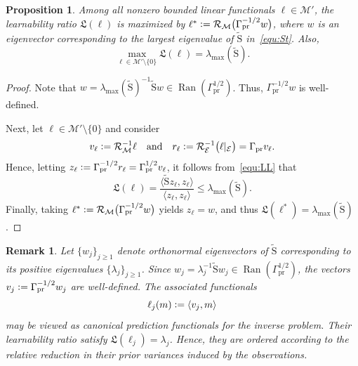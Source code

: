\documentclass[ba]{imsart}
\theoremstyle{plain}
\newtheorem{proposition}[theorem]{Proposition}
\newtheorem{remark}[theorem]{Remark}
\newcommand{\defeq}{\vcentcolon=}
\newcommand{\prcov}{\Gamma_{\mathrm{pr}}}
\newcommand{\St}{\widetilde{\mathrm{S}}}
\newcommand{\dpar}{{m}}
\newcommand{\ip}[2]{\langle {#1}, {#2}\rangle}
\newcommand{\M}{\mathcal{M}}
\newcommand{\RR}{\mathcal{R}}
\newcommand{\LL}{\mathfrak{L}}
\newcommand{\CM}{\mathcal{E}}
\begin{document}
\begin{proposition}\label{prp:max-learnability}
Among all nonzero bounded linear functionals
$\ell\in\M'$, the learnability ratio $\LL(\ell)$ is maximized by
$\ell^* \defeq \RR_{\M}\bigl(\prcov^{-1/2}w\bigr)$,
where $w$ is an eigenvector corresponding to the largest eigenvalue of
$\St$ in~\eqref{equ:St}. Also,
\[
    \max_{\ell\in\M'\setminus\{0\}}\LL(\ell)
    =
    \lambda_{\max}(\St).
\]
\end{proposition}
\begin{proof}
Note that $w = \lambda_{\max}(\St)^{-1}\St w \in \operatorname{Ran}(\prcov^{1/2})$.
Thus, $\prcov^{-1/2}w$ is well-defined.

Next, let $\ell\in\M'\setminus\{0\}$ and consider
\[
    v_\ell\defeq \RR_{\M}^{-1}\ell \quad\text{and}\quad
    r_\ell
    \defeq
    \RR_{\CM}^{-1}\bigl(\ell|_{\CM}\bigr) = \prcov v_\ell.
\]
Hence, 
letting 
$z_\ell\defeq \prcov^{-1/2}r_\ell = \prcov^{1/2}v_\ell$, 
it follows from~\eqref{equ:LL} that
\[
    \LL(\ell)
    =
    \frac{\ip{\St z_\ell}{z_\ell}}{\ip{z_\ell}{z_\ell}}
    \leq
    \lambda_{\max}(\St).
\]
Finally, taking
$\ell^*\defeq\RR_{\M}\bigl(\prcov^{-1/2}w\bigr)$
yields $z_\ell=w$, and thus
$\LL(\ell^*)=\lambda_{\max}(\St)$.
\end{proof}

\begin{remark}
Let $\{w_j\}_{j\geq 1}$ denote orthonormal eigenvectors of $\St$
corresponding to its positive eigenvalues $\{\lambda_j\}_{j\geq 1}$.
Since
$w_j = \lambda_j^{-1}\St w_j \in \operatorname{Ran}(\prcov^{1/2})$,
the vectors
$v_j \defeq \prcov^{-1/2}w_j$
are well-defined. The associated functionals
\[
    \ell_j(\dpar) \defeq \ip{v_j}{\dpar}
\]
may be viewed as canonical prediction functionals for the inverse problem.
Their learnability ratio satisfy
$\LL(\ell_j)=\lambda_j$.
Hence, they are ordered according to the relative reduction in their prior
variances induced by the observations.
\end{remark}
\end{document}
